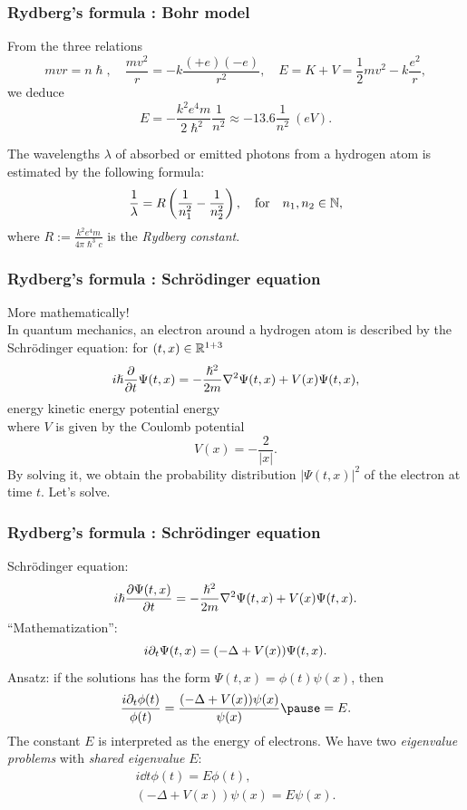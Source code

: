 \documentclass{beamer}
\begin{document}
\begin{frame}
\frametitle{Rydberg's formula : Bohr model}
  From the three relations
  \[mvr=n\hslash,\quad\frac{mv^2}r=-k\frac{(+e)(-e)}{r^2},\quad E=K+V=\frac12mv^2-k\frac{e^2}r,\]
  \pause we deduce
  \[E=-\frac{k^2e^4m}{2\hslash^2}\frac1{n^2}\approx-13.6\frac1{n^2}\ (eV).\]
  \pause
  \begin{prop}
    The wavelengths $\lambda$ of absorbed or emitted photons from a hydrogen atom is estimated by the following formula:
    \[\frac1\lambda=R\left(\frac1{n_1^2}-\frac1{n_2^2}\right),\quad\text{for}\quad n_1,n_2\in\mathbb{N},\]
    where $R:=\frac{k^2e^4m}{4\pi\hslash^3c}$ is the \emph{Rydberg constant}.
  \end{prop}
\end{frame}

\begin{frame}
\frametitle{Rydberg's formula : Schr\"odinger equation}
  More mathematically!\\
  \pause In quantum mechanics, an electron around a hydrogen atom is described by the Schr\"odinger equation: for $(t,x)\in\mathbb{R}^{1+3}$
  \[i\hslash\pd{t}\Psi(t,x)=-\frac{\hslash^2}{2m}\del^2\Psi(t,x)+V(x)\Psi(t,x),\]
  \pause \hspace{5em} energy \hspace{2em} kinetic energy \hspace{1em} potential energy\\
  \bigskip
  \pause where $V$ is given by the Coulomb potential
  \[V(x)=-\frac2{|x|}.\]
  \pause By solving it, we obtain the probability distribution $|\Psi(t,x)|^2$ of the electron at time $t$.
  \pause Let's solve.
\end{frame}

\begin{frame}
\frametitle{Rydberg's formula : Schr\"odinger equation}
  Schr\"odinger equation:
  \[i\hslash\pd{\Psi(t,x)}{t}=-\frac{\hslash^2}{2m}\del^2\Psi(t,x)+V(x)\Psi(t,x).\]
  \pause ``Mathematization'':
  \[i\pd_t\Psi(t,x)=(-\Delta+V(x))\Psi(t,x).\]
  \pause
  Ansatz: if the solutions has the form $\Psi(t,x)=\phi(t)\psi(x)$, then\pause
  \[\frac{i\pd_t\phi(t)}{\phi(t)}=\frac{(-\Delta+V(x))\psi(x)}{\psi(x)}\pause=E.\]
  \pause The constant $E$ is interpreted as the energy of electrons.
  \pause We have two \emph{eigenvalue problems} with \emph{shared eigenvalue} $E$:\pause
  \begin{gather*}
    i\dd{t}\phi(t)=E\phi(t),\\
    (-\Delta+V(x))\psi(x)=E\psi(x).
  \end{gather*}
\end{frame}
\end{document}
